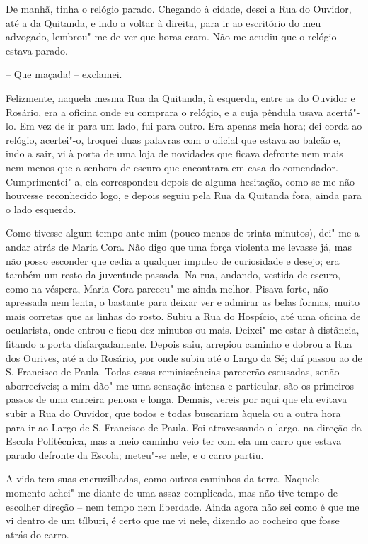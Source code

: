 De manhã, tinha o relógio parado. Chegando à cidade, desci a Rua do
Ouvidor, até a da Quitanda, e indo a voltar à direita, para ir ao
escritório do meu advogado, lembrou"-me de ver que horas eram. Não me
acudiu que o relógio estava parado.

-- Que maçada! -- exclamei.

Felizmente, naquela mesma Rua da Quitanda, à esquerda, entre as do
Ouvidor e Rosário, era a oficina onde eu comprara o relógio, e a cuja
pêndula usava acertá"-lo. Em vez de ir para um lado, fui para outro. Era
apenas meia hora; dei corda ao relógio, acertei"-o, troquei duas palavras
com o oficial que estava ao balcão e, indo a sair, vi à porta de uma
loja de novidades que ficava defronte nem mais nem menos que a senhora
de escuro que encontrara em casa do comendador. Cumprimentei"-a, ela
correspondeu depois de alguma hesitação, como se me não houvesse
reconhecido logo, e depois seguiu pela Rua da Quitanda fora, ainda para
o lado esquerdo.

Como tivesse algum tempo ante mim (pouco menos de trinta minutos),
dei"-me a andar atrás de Maria Cora. Não digo que uma força violenta me
levasse já, mas não posso esconder que cedia a qualquer impulso de
curiosidade e desejo; era também um resto da juventude passada. Na rua,
andando, vestida de escuro, como na véspera, Maria Cora pareceu"-me ainda
melhor. Pisava forte, não apressada nem lenta, o bastante para deixar
ver e admirar as belas formas, muito mais corretas que as linhas do
rosto. Subiu a Rua do Hospício, até uma oficina de ocularista, onde
entrou e ficou dez minutos ou mais. Deixei"-me estar à distância, fitando
a porta disfarçadamente. Depois saiu, arrepiou caminho e dobrou a Rua
dos Ourives, até a do Rosário, por onde subiu até o Largo da Sé; daí
passou ao de S. Francisco de Paula. Todas essas reminiscências parecerão
escusadas, senão aborrecíveis; a mim dão"-me uma sensação intensa e
particular, são os primeiros passos de uma carreira penosa e longa.
Demais, vereis por aqui que ela evitava subir a Rua do Ouvidor, que
todos e todas buscariam àquela ou a outra hora para ir ao Largo de S.
Francisco de Paula. Foi atravessando o largo, na direção da Escola
Politécnica, mas a meio caminho veio ter com ela um carro que estava
parado defronte da Escola; meteu"-se nele, e o carro partiu.

A vida tem suas encruzilhadas, como outros caminhos da terra. Naquele
momento achei"-me diante de uma assaz complicada, mas não tive tempo de
escolher direção -- nem tempo nem liberdade. Ainda agora não sei como é
que me vi dentro de um tílburi, é certo que me vi nele, dizendo ao
cocheiro que fosse atrás do carro.

